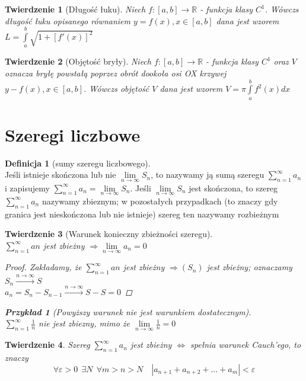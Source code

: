 \documentclass[12pt,a4paper]{article}
\newtheorem{tw}{Twierdzenie}
\newtheorem{przyklad}{Przykład}
\theoremstyle{definition}
\newtheorem{df}{Definicja}
\begin{document}
\begin{tw}[Długość łuku]
Niech $f: [a,b] \to \mathbb{R}$ - funkcja klasy $C^1$. Wówczs długość łuku opisanego równaniem $y=f(x), x\in [a,b]$ dana jest wzorem $L = \int\limits_a^b \sqrt{1 + \left[f'(x)\right]^2}$
\end{tw}

\begin{tw}[Objętość bryły]
Niech $f: [a,b] \to \mathbb{R}$ - funkcja klasy $C^1$ oraz $V$ oznacza bryłę powstałą poprzez obrót
 dookoła osi OX krzywej $y - f(x), x\in [a,b]$. Wówczs objętość $V$ dana jest wzorem $V = \pi\int\limits_a^b f^2(x)dx$
\end{tw}


\section{Szeregi liczbowe}

\begin{df}[sumy szeregu liczbowego]~\\
Jeśli istnieje skończona lub nie $\lim\limits_{n\to\infty}S_n$, to nazywamy ją sumą szeregu $\sum\limits_{n=1}^\infty a_n$ i zapisujemy $\sum\limits_{n=1}^\infty a_n=\lim\limits_{n\to\infty}S_n$.
Jeśli $\lim\limits_{n\to\infty}S_n$ jest skończona, to szereg $\sum\limits_{n=1}^\infty a_n$ nazywamy zbieznym; w pozostałych przypadkach (to znaczy gdy granica jest nieskończona lub nie istnieje) szereg ten nazywamy rozbieżnym
\end{df}

\begin{tw}[Warunek konieczny zbieżności szeregu]~\\
$\sum\limits_{n=1}^\infty an$ jest zbieżny $\Rightarrow \lim\limits_{n\to\infty}a_n = 0$
\begin{proof}
Zakładamy, że $\sum\limits_{n=1}^\infty an$ jest zbieżny $\Rightarrow (S_n)$ jest zbieżny; oznaczamy 
$S_n \xrightarrow{n\to\infty} S$\\
$a_n = S_n - S_{n-1} \xrightarrow{n\to\infty} S - S = 0$ 
\end{proof}
\begin{przyklad}[Powyższy warunek nie jest warunkiem dostatecznym]~\\
$\sum\limits_{n=1}^\infty \frac{1}{n}$ nie jest zbiezny, mimo że $\lim\limits_{n\to\infty} \frac{1}{n} = 0$
\end{przyklad}
\end{tw}

\begin{tw}
Szereg $\sum\limits_{n=1}^\infty a_n$ jest zbieżny $\Leftrightarrow$ spełnia warunek Cauch'ego, to znaczy
$$
\forall \varepsilon > 0 ~~\exists N ~~\forall m > n > N \quad |a_{n+1} + a_{n+2} + \dots + a_m| < \varepsilon
$$
\end{tw}
\end{document}
